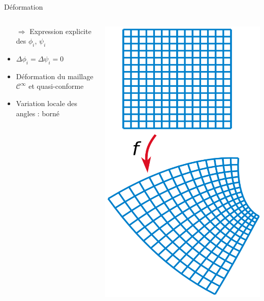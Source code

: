 \documentclass{beamer}
\begin{document}
\begin{frame}{Déformation}
\begin{columns}
\begin{column}{.8\textwidth}
\begin{itemize}
\item[$\Rightarrow$] Expression explicite des $\phi_i$, $\psi_i$
\item $\Delta \phi_i = \Delta \psi_i = 0$
\item Déformation du maillage $\mathcal{C}^\infty$ et \alert{quasi-conforme}
\item Variation locale des angles : \alert{borné}
\end{itemize}
	\end{column}
	\begin{column}{.2\textwidth}
\includegraphics[width=\textwidth]{conformal}
	\end{column}
\end{columns}

\end{frame}
\end{document}
